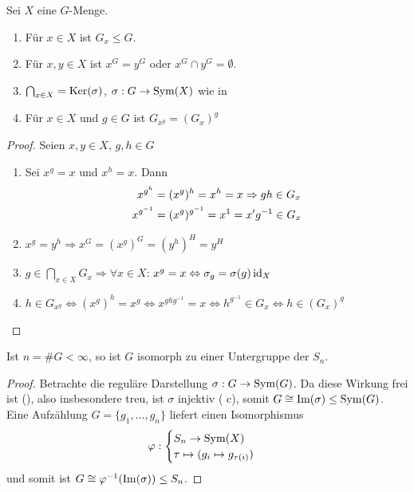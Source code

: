 \begin{lemma}
	Sei $X$ eine $G$-Menge.
	\begin{enumerate}[label=(\alph*)]
		\item Für $x\in X$ ist $G_x\le G$.
		\item Für $x,y\in X$ ist $x^G=y^G$ oder $x^G\cap y^G=\emptyset$.
		\item $\bigcap_{x\in X}=\operatorname{Ker}(\sigma)$, $\sigma:G\to\operatorname{Sym}(X)$ wie in 
		\item Für $x\in X$ und $g\in G$ ist $G_{x^g}=(G_x)^g$
	\end{enumerate}
\end{lemma}
\begin{proof}
	Seien $x,y\in X$, $g,h\in G$
	\begin{enumerate}[label=(\alph*)]
		\item Sei $x^g=x$ und $x^h=x$. Dann
		\begin{align}
			x^{g^h}&=(x^g)^h=x^h=x\Rightarrow gh\in G_x \notag \\
			x^{g^{-1}} &= (x^g)^{g^{-1}} = x^1 = x\RightTorque g^{-1}\in G_x \notag
		\end{align}
		\item $x^g=y^h\Rightarrow x^G=(x^g)^G=(y^h)^H=y^H$
		\item $g\in\bigcap_{x\in X} G_x\Rightarrow\forall x\in X$: $x^g=x\Leftrightarrow \sigma_g=\sigma(g)\operatorname{id}_X$
		\item $h\in G_{x^g}\Leftrightarrow (x^g)^h=x^g\Leftrightarrow x^{ghg^{-1}}=x\Leftrightarrow h^{g^{-1}}\in G_x\Leftrightarrow h\in (G_x)^g$
	\end{enumerate}
\end{proof}

\begin{proposition}
	Ist $n=\#G<\infty$, so ist $G$ isomorph zu einer Untergruppe der $S_n$.
\end{proposition}
\begin{proof}
	Betrachte die reguläre Darstellung $\sigma:G\to\operatorname{Sym}(G)$. Da diese Wirkung frei ist (), also insbesondere treu, ist $\sigma$ injektiv ( c), somit $G\cong \operatorname{Im}(\sigma)\le\operatorname{Sym}(G)$. Eine Aufzählung $G=\{g_1,...,g_n\}$ liefert einen Isomorphismus
	\begin{align}
		\varphi:\begin{cases}
			S_n\to \operatorname{Sym}(X) \\ \tau\mapsto (g_i\mapsto g_{\tau(i)})
		\end{cases}\notag
	\end{align}
	und somit ist $G\cong \varphi^{-1}(\operatorname{Im}(\sigma))\le S_n$.
\end{proof}

